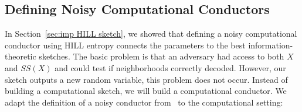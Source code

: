 \documentclass[11pt]{article}
\newcommand{\secref}[1]{\mbox{Section~\ref{#1}}}
\newcommand{\class}[1]{{\ensuremath{\mathsf{#1}}}}
\newcommand{\sketch}{\ensuremath{\class{SS}}\xspace}
\newcommand{\rec}{\ensuremath{\class{Rec}}\xspace}
\newcommand{\sample}{\ensuremath{\class{Sample}}\xspace}
\newcommand{\dis}{\ensuremath{\mathsf{dis}}}
\newcommand{\ngl}{\ensuremath{\mathtt{ngl}}\xspace}
\newcommand{\Hav}{\tilde{\mathrm{H}}_\infty}
\newtheorem{definition}[theorem]{Definition}
\newtheorem{claim}[theorem]{Claim}
\newcommand{\authnote}[2]{{\textcolor{red}{\textsf{#1 notes: }\textcolor{blue}{ #2}}\marginpar{\textcolor{red}{\textbf{!!!!!}}}}}
\newcommand{\authnote}[2]{}
\newcommand{\bnote}[1]{{\authnote{Ben}{#1}}}
\begin{document}
%
%
%

\subsection{Defining Noisy Computational Conductors}
\label{sec:unp secure sketch}
In \secref{sec:imp HILL sketch}, we showed that defining a noisy computational conductor using HILL entropy connects the parameters to the best information-theoretic sketches.  The basic problem is that an adversary had access to both $X$ and $SS(X)$ and could test if neighborhoods correctly decoded.  However, our sketch outputs a new random variable, this problem does not occur.  Instead of building a computational sketch, we will build a computational conductor.  We adapt the definition of a noisy conductor from~\cite{KanukurthiR09} to the computational setting:
\end{document}
